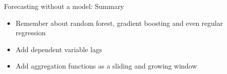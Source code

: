 \begin{frame}{Forecasting without a model: Summary}
	
	\begin{itemize}[<+->]
		\item Remember about \alert{random forest}, \alert{gradient boosting} and even \alert{regular regression}
		\item Add \alert{dependent variable lags}
		\item Add \alert{aggregation functions} as a sliding and growing window
	\end{itemize}
\end{frame}